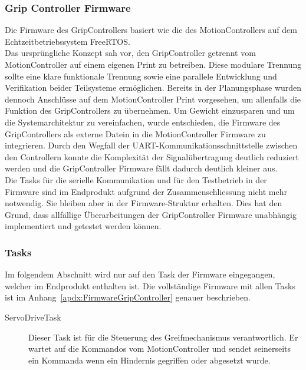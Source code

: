 \documentclass[main.tex]{subfiles} %
\begin{document}

\subsubsection{Grip Controller Firmware}

Die Firmware des GripControllers basiert wie die des MotionControllers auf dem Echtzeitbetriebssystem FreeRTOS.\\
Das ursprüngliche Konzept sah vor, den GripController getrennt vom MotionController auf einem
eigenen Print zu betreiben. Diese modulare Trennung sollte eine klare funktionale Trennung
sowie eine parallele Entwicklung und Verifikation beider Teilsysteme ermöglichen. Bereits in der Planungsphase
wurden dennoch Anschlüsse auf dem MotionController Print vorgesehen, um allenfalls die Funktion des
GripControllers zu übernehmen. Um Gewicht einzusparen und um die Systemarchitektur zu vereinfachen,
wurde entschieden, die Firmware des GripControllers als externe Datein in die MotionController Firmware
zu integrieren. Durch den Wegfall der UART-Kommunikationsschnittstelle zwischen den Controllern
konnte die Komplexität der Signalübertragung deutlich reduziert werden und die GripController Firmware fällt dadurch
deutlich kleiner aus.\\

Die Tasks für die serielle Kommunikation und für den Testbetrieb in der Firmware sind im Endprodukt aufgrund
der Zusammenschliessung nicht mehr notwendig. Sie bleiben aber 
in der Firmware-Struktur erhalten. Dies hat den Grund, dass allfällige Überarbeitungen der GripController
Firmware unabhängig implementiert und getestet werden können.\\

\subsubsection*{Tasks}
Im folgendem Abschnitt wird nur auf den Task der Firmware eingegangen, welcher im Endprodukt enthalten ist.
Die vollständige Firmware mit allen Tasks ist im Anhang~\ref{apdx:FirmwareGripController} genauer beschrieben.

\begin{description}
    \item[ServoDriveTask] Dieser Task ist für die Steuerung des Greifmechanismus verantwortlich. Er wartet auf
    die Kommandos vom MotionController und sendet seinerseits ein Kommanda wenn ein Hindernis gegriffen oder abgesetzt
    wurde.
\end{description}
\end{document}
